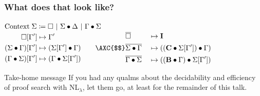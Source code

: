 \documentclass{beamer}
\begin{document}
\begin{frame}
  \frametitle{What does that look like?}
  \centering
  \vfill
  \(\!
  \begin{aligned}
    \text{Context}\;\Sigma\coloneqq\square\ \vert\ \Sigma\bullet\Delta\ \vert\ \Gamma\bullet\Sigma
  \end{aligned}
  \)
  \vfill
  \(\!
  \begin{aligned}
    \square   [\Gamma']&\mapsto \Gamma'\\
    (\Sigma\prodl\Gamma)[\Gamma']&\mapsto (\Sigma[\Gamma']\prod \Gamma)\\
    (\Gamma\prodr\Sigma)[\Gamma']&\mapsto (\Gamma\prod \Sigma[\Gamma'])
  \end{aligned}
  \qquad
  \begin{aligned}
    &\overline{\square}
    &&\mapsto \I\\
    \AXC{$$}
    &\overline{\Sigma\prodl\Gamma}
    &&\mapsto ((\C\prod \Sigma[\Gamma'])\prod \Gamma)\\
    &\overline{\Gamma\prodr\Sigma}
    &&\mapsto ((\B\prod \Gamma)\prod \Sigma[\Gamma'])
  \end{aligned}
  \)
  \vfill
  \begin{pfbox}
  \end{pfbox}
  \begin{pfbox}
  \end{pfbox}
  \vfill
\end{frame}

\begin{frame}
  \begin{block}{Take-home message}
    If you had any qualms about the decidability and efficiency of proof search
    with NL$_\lambda$, let them go, at least for the remainder of this talk.
  \end{block}
\end{frame}
\end{document}
